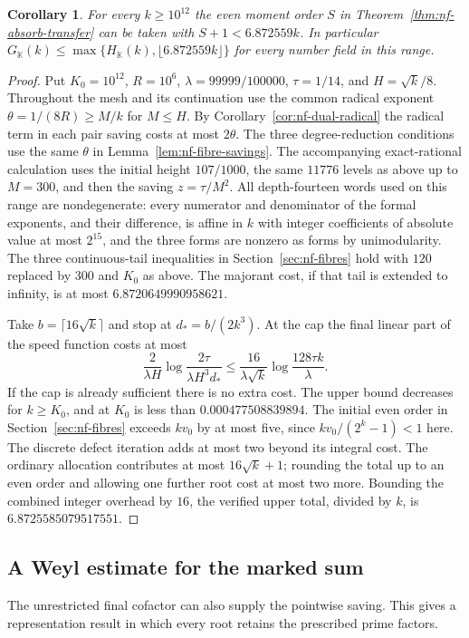 \documentclass[11pt,letterpaper]{article}
\newtheorem{corollary}[corollary]{Corollary}
\theoremstyle{definition}
\numberwithin{equation}{section}
\begin{document}
\begin{corollary}\label{cor:nf-explicit-large-linear}
For every $k\ge10^{12}$ the even moment order $S$ in
Theorem~\ref{thm:nf-absorb-transfer} can be taken with
$S+1<6.872559k$. In particular
$G_{\mathbb K}(k)\le\max\{H_{\mathbb K}(k),\lfloor6.872559k\rfloor\}$ for every
number field in this range.
\end{corollary}
\begin{proof}
Put $K_0=10^{12}$, $R=10^6$, $\lambda=99999/100000$,
$\tau=1/14$, and $H=\sqrt{k}/8$. Throughout the mesh and its
continuation use the common radical exponent
$\theta=1/(8R)\ge M/k$ for $M\le H$. By
Corollary~\ref{cor:nf-dual-radical} the radical term in each
pair saving costs at most $2\theta$. The three degree-reduction
conditions use the same $\theta$ in
Lemma~\ref{lem:nf-fibre-savings}. The accompanying exact-rational
calculation uses the initial height $107/1000$, the same $11776$
levels as above up to $M=300$, and then the saving $z=\tau/M^2$.
All depth-fourteen words used on this range are nondegenerate:
every numerator and denominator of the formal exponents, and their
difference, is affine in $k$ with integer coefficients of absolute
value at most $2^{15}$, and the three forms are nonzero as forms
by unimodularity. The three continuous-tail inequalities in
Section~\ref{sec:nf-fibres} hold with $120$ replaced by $300$
and $K_0$ as above. The majorant cost, if that tail is extended
to infinity, is at most $6.8720649990958621$.

Take $b=\lceil16\sqrt k\rceil$ and stop at $d_*=b/(2k^3)$.
At the cap the final linear part of the speed function costs at
most
\[
 \frac{2}{\lambda H}
      \log\frac{2\tau}{\lambda H^3d_*}
 \le \frac{16}{\lambda\sqrt k}\log\frac{128\tau k}{\lambda}.
\]
If the cap is already sufficient there is no extra cost.
The upper bound decreases for $k\ge K_0$, and at $K_0$ is
less than $0.000477508839894$. The initial even order in
Section~\ref{sec:nf-fibres} exceeds $kv_0$ by at most five,
since $kv_0/(2^k-1)<1$ here. The discrete defect iteration
adds at most two beyond its integral cost. The ordinary allocation
contributes at most $16\sqrt k+1$; rounding the total up to an even
order and allowing one further root cost at most two more.
Bounding the combined integer overhead by $16$, the verified
upper total, divided by $k$, is $6.8725585079517551$.
\end{proof}

\subsection{A Weyl estimate for the marked sum}
\label{sec:nf-marked-weyl}
The unrestricted final cofactor can also supply the pointwise saving.
This gives a representation result in which every root retains the
prescribed prime factors.
\end{document}
